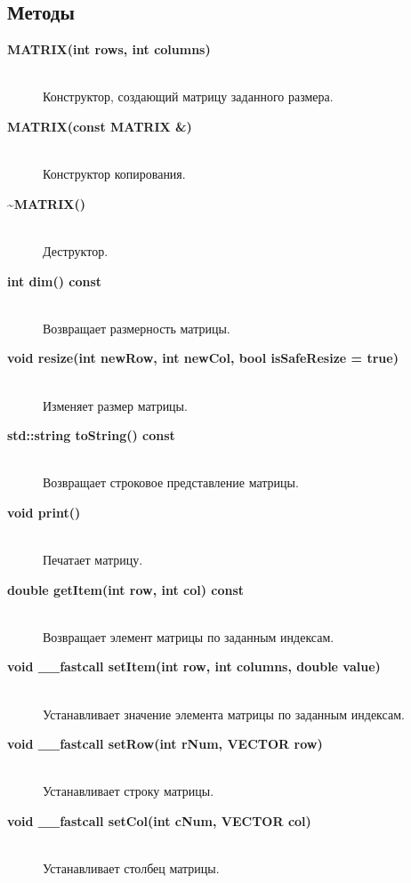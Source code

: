 \documentclass{article}
\begin{document}
\subsection*{Методы}
\begin{description}
    \item[\textbf{MATRIX(int rows, int columns)}] \hfill \\
    Конструктор, создающий матрицу заданного размера.
    
    \item[\textbf{MATRIX(const MATRIX \&)}] \hfill \\
    Конструктор копирования.
    
    \item[\textbf{\textasciitilde MATRIX()}] \hfill \\
    Деструктор.
    
    
    \item[\textbf{int dim() const}] \hfill \\
    Возвращает размерность матрицы.
    
    \item[\textbf{void resize(int newRow, int newCol, bool isSafeResize = true)}] \hfill \\
    Изменяет размер матрицы.
    
    \item[\textbf{std::string toString() const}] \hfill \\
    Возвращает строковое представление матрицы.
    
    \item[\textbf{void print()}] \hfill \\
    Печатает матрицу.
    
    \item[\textbf{double getItem(int row, int col) const}] \hfill \\
    Возвращает элемент матрицы по заданным индексам.
    
    \item[\textbf{void \_\_fastcall setItem(int row, int columns, double value)}] \hfill \\
    Устанавливает значение элемента матрицы по заданным индексам.
    
    \item[\textbf{void \_\_fastcall setRow(int rNum, VECTOR row)}] \hfill \\
    Устанавливает строку матрицы.
    
    \item[\textbf{void \_\_fastcall setCol(int cNum, VECTOR col)}] \hfill \\
    Устанавливает столбец матрицы.
    

\end{description}
\end{document}
